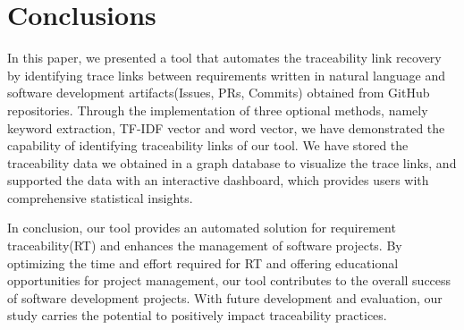 \section{Conclusions}
\label{sec:conc}

In this paper, we presented a tool that automates the traceability link recovery by identifying trace links between requirements written in natural language and software development artifacts(Issues, PRs, Commits) obtained from GitHub repositories. Through the implementation of three optional methods, namely keyword extraction, TF-IDF vector and word vector, we have demonstrated the capability of identifying traceability links of our tool. We have stored the traceability data we obtained in a graph database to visualize the trace links, and supported the data with an interactive dashboard, which provides users with comprehensive statistical insights.

In conclusion, our tool provides an automated solution for requirement traceability(RT) and enhances the management of software projects. By optimizing the time and effort required for RT and offering educational opportunities for project management, our tool contributes to the overall success of software development projects. With future development and evaluation, our study carries the potential to positively impact traceability practices.

